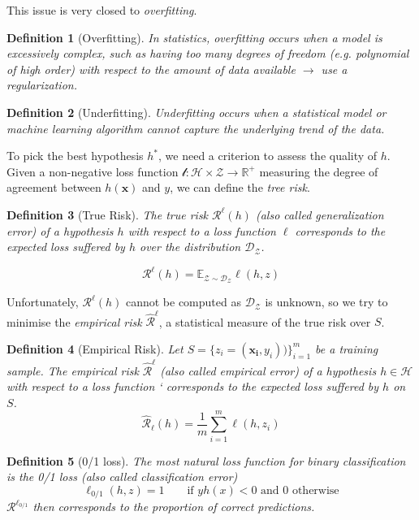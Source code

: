 \documentclass{article}
\newtheorem{defi}{Definition}
\begin{document}
This issue is very closed to \emph{overfitting}.


\begin{defi}[Overfitting]
In statistics, \emph{overfitting} occurs when a model is excessively complex, such as having too many degrees of freedom (e.g. polynomial of high order) with respect to the amount of data available $\to$ use a \emph{regularization}.
\end{defi}

\begin{defi}[Underfitting]
\emph{Underfitting} occurs when a statistical model or machine learning algorithm cannot capture the underlying trend of the data.
\end{defi}
\bigskip

To pick the best hypothesis $h^*$, we need a criterion to assess the quality of $h$. Given a non-negative loss function $\mathcal{l} : \mathcal{H} \times \mathcal{Z} \to \mathbb{R}^+$ measuring the degree of agreement between $h(\mathbf{x})$ and $y$, we can define the \emph{tree risk}.

\begin{defi}[True Risk]
The true risk $\mathcal{R}^{\ell}(h)$ (also called \emph{generalization error}) of a hypothesis $h$ with respect to a loss function $\ell$ corresponds to the expected loss suffered by $h$ over the distribution $\mathcal{D}_{\mathcal{Z}}$.

\[\mathcal{R}^{\ell}(h)=\mathbb{E}_{\mathcal{Z}\sim \mathcal{D}_{\mathcal{Z}}} \ell(h,z)\]
\end{defi}


Unfortunately, $\mathcal{R}^\ell(h)$ cannot be computed as $\mathcal{D}_\mathcal{Z}$ is unknown, so we try to minimise the \emph{empirical risk} $\hat{\mathcal{R}}^\ell$, a statistical measure of the true risk over $S$.

\begin{defi}[Empirical Risk]
Let $S = \{ z_i = (\mathbf{x_i},y_i))\}_{i=1}^m$ be a training sample. The empirical risk $\hat{\mathcal{R}}^{\ell}$ (also called empirical error) of a hypothesis $h\in \mathcal{H}$ with respect to a loss
function ` corresponds to the expected loss suffered by $h$ on $S$.
\[\hat{\mathcal{R}}_\ell(h)= \frac{1}{m} \sum_{i=1}^m \ell (h,z_i)\]
\end{defi}

\begin{defi}[0/1 loss]
The most natural loss function for binary classification is the 0/1 loss (also called classification error)
\[\ell_{0/1}(h,z)=1 \qquad\text{if $yh(x)<0$ and 0 otherwise} \]
$\mathcal{R}^{\ell_{0/1}}$ then corresponds to the proportion of correct predictions.
\end{defi}
\end{document}
